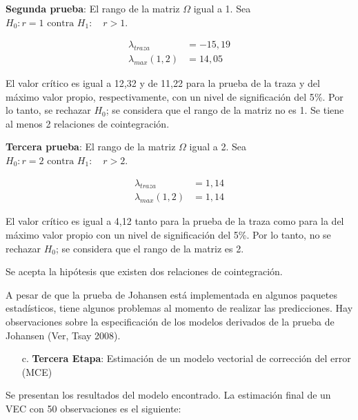 \textbf{Segunda prueba}: El rango de la matriz $\Omega$ igual a 1. Sea $H_{0}: r=1\text{ contra }H_{1}:\quad r>1$.

\begin{align*}
 \lambda_{traza} &= -15,19 \\ 
 \lambda_{max}\left( 1,2 \right) &=14,05
\end{align*}

El valor cr\'{i}tico es igual a 12,32 y de 11,22 para la prueba de la traza y del m\'{a}ximo valor propio, respectivamente, con un nivel de significaci\'{o}n del 5{\%}. Por lo tanto, se rechazar $H_{0}$; se considera que el rango de la matriz no es 1. Se tiene al menos 2 relaciones de cointegraci\'{o}n.\newline

\textbf{Tercera prueba}: El rango de la matriz $\Omega$ igual a 2. Sea $H_{0}: r=2\text{ contra }H_{1}:\quad r>2$.

\begin{align*}
 \lambda_{traza} &= 1,14 \\ 
 \lambda_{max}\left( 1,2 \right) &= 1,14 
\end{align*}

El valor cr\'{i}tico es igual a 4,12 tanto para la prueba de la traza como para la del m\'{a}ximo valor propio con un nivel de significaci\'{o}n del 5{\%}. Por lo tanto, no se rechazar $H_{0}$; se considera que el rango de la matriz es 2.\newline

Se acepta la hip\'{o}tesis que existen dos relaciones de cointegraci\'{o}n.\newline

\begin{observacion}
A pesar de que la prueba de Johansen est\'{a} implementada en algunos paquetes estad\'{i}sticos, tiene algunos problemas al momento de realizar las predicciones. Hay observaciones sobre la especificaci\'{o}n de los modelos derivados de la prueba de Johansen (Ver, Tsay 2008).
\end{observacion}

\begin{enumerate}
\item[c.] \textbf{Tercera Etapa}: Estimaci\'{o}n de un modelo vectorial de correcci\'{o}n del error (MCE)
\end{enumerate}

Se presentan los resultados del modelo encontrado. La estimaci\'{o}n final de un VEC con 50 observaciones es el siguiente:

